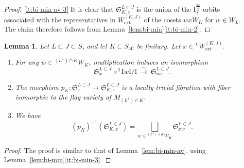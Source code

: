 \documentclass[11pt]{amsart}
\numberwithin{equation}{section}
\theoremstyle{plain}
\newtheorem{lem}[thm]{Lemma}
\theoremstyle{definition}
\newcommand{\I}{{\mathrm I}}
\newcommand{\rQ}{{\mathrm Q}}
\newcommand{\xs}{{\ \xrightarrow{\sim}\ }}
\newcommand{\quar}{{{\frac{\infty}{4}}}}
\newcommand{\ex}{\mathrm{ext}}
\newcommand{\af}{\mathrm{aff}}
\newcommand{\rS}{\mathfrak{S}}
\begin{document}
\begin{proof}
\eqref{it:bi-min-av-3}
It is clear that $\rS_{K,x}^{L \subset J}$ is the union of the $\I^\quar_J$-orbits associated with the representatives in $W_\ex^{(K,J)}$ of the cosets $wxW_K$ for $w \in W_L$. The claim therefore follows from
Lemma~\ref{lem:bi-min}\eqref{it:bi-min-2}.
%
\end{proof}

\begin{lem}
\label{lem:bi-min-push}
Let $L \subset J \subset S$, and let $K \subset S_\af$ be finitary.
Let $x\in {}^L W_\ex^{(K,J)}$. 
\begin{enumerate}
\item 
\label{it:bi-min-push-1}
For any $w\in {}^{(L^x)\cap K}W_K$, multiplication induces an isomorphism
\[
\rS^{L \subset J}_{x}\times^{\I}\I \dot{w}\I/\I \xs \rS^{L \subset J}_{xw}.
\]
\item
\label{it:bi-min-push-2}
The morphism $p_K: \rS^{L \subset J}_{x}\rightarrow \rS^{L \subset J}_{K,x}$ is a locally trivial fibration with fiber isomorphic to the flag variety of $M_{(L^x) \cap K}$. 
\item
\label{it:bi-min-push-3}
We have 
\[
(p_K)^{-1}(\rS^{L \subset J}_{K,x})=\bigsqcup_{w\in {}^{(L^x) \cap K}W_K} \rS^{L \subset J}_{xw}. 
\] 
\end{enumerate}
\end{lem}

\begin{proof}
The proof is similar to that of
Lemma~\ref{lem:bi-min-av}, using Lemma~\ref{lem:bi-min}\eqref{it:bi-min-3}.
\end{proof}



\end{document}
